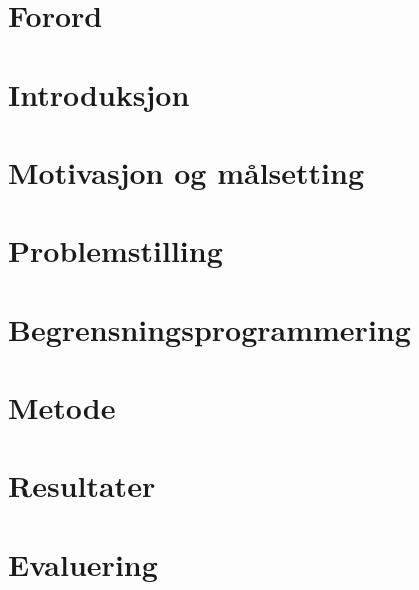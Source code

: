 \documentclass[12pt,twoside,norsk,onecolumn]{article}
\begin{document}
\section*{Forord}

\newpage

\newcommand{\bht}{Bård Henning Tvedt }
\newcommand{\bhtmb}{Bård Henning Tvedt og Marc Bezem }
\newcommand{\ilog}{ILOG Scheduler }

\tableofcontents
\newpage

\listoftables
\newpage
\listoffigures
\newpage

\begin{center}
\printnomenclature[3.5 cm]
\end{center}
\newpage

\section{Introduksjon}



\section{Motivasjon og målsetting}


\section{Problemstilling}


\section{Begrensningsprogrammering}


\section{Metode}


\section{Resultater}


\section{Evaluering}

\end{document}
